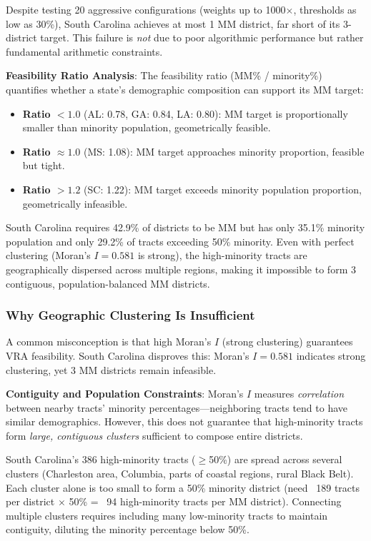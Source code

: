 Despite testing 20 aggressive configurations (weights up to 1000$\times$, thresholds as low as 30\%), South Carolina achieves at most 1 MM district, far short of its 3-district target. This failure is \emph{not} due to poor algorithmic performance but rather fundamental arithmetic constraints.

\textbf{Feasibility Ratio Analysis}: The feasibility ratio (MM\% / minority\%) quantifies whether a state's demographic composition can support its MM target:
\begin{itemize}
    \item \textbf{Ratio $< 1.0$} (AL: 0.78, GA: 0.84, LA: 0.80): MM target is proportionally smaller than minority population, geometrically feasible.
    \item \textbf{Ratio $\approx 1.0$} (MS: 1.08): MM target approaches minority proportion, feasible but tight.
    \item \textbf{Ratio $> 1.2$} (SC: 1.22): MM target exceeds minority population proportion, geometrically infeasible.
\end{itemize}

South Carolina requires 42.9\% of districts to be MM but has only 35.1\% minority population and only 29.2\% of tracts exceeding 50\% minority. Even with perfect clustering (Moran's $I = 0.581$ is strong), the high-minority tracts are geographically dispersed across multiple regions, making it impossible to form 3 contiguous, population-balanced MM districts.

\subsubsection{Why Geographic Clustering Is Insufficient}

A common misconception is that high Moran's $I$ (strong clustering) guarantees VRA feasibility. South Carolina disproves this: Moran's $I = 0.581$ indicates strong clustering, yet 3 MM districts remain infeasible.

\textbf{Contiguity and Population Constraints}: Moran's $I$ measures \emph{correlation} between nearby tracts' minority percentages---neighboring tracts tend to have similar demographics. However, this does not guarantee that high-minority tracts form \emph{large, contiguous clusters} sufficient to compose entire districts.

South Carolina's 386 high-minority tracts ($\geq$50\%) are spread across several clusters (Charleston area, Columbia, parts of coastal regions, rural Black Belt). Each cluster alone is too small to form a 50\% minority district (need ~189 tracts per district $\times$ 50\% = ~94 high-minority tracts per MM district). Connecting multiple clusters requires including many low-minority tracts to maintain contiguity, diluting the minority percentage below 50\%.

